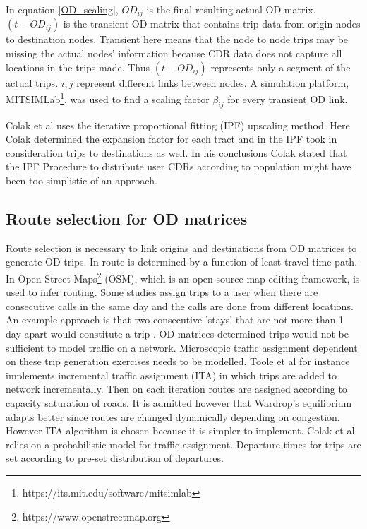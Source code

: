 \documentclass[12pt, a4paper]{report}
\theoremstyle{definition}
\theoremstyle{definition}%
\theoremstyle{definition}%
\theoremstyle{definition}%
\theoremstyle{definition}%
\theoremstyle{definition}%
\begin{document}
In equation \ref{OD_scaling}, $OD_{ij}$ is the final resulting actual OD matrix.  $(t-OD_{ij})$ is the transient OD matrix that contains trip data from origin nodes to destination nodes. Transient here means that the node to node trips may be missing the actual nodes' information because CDR data does not capture all locations in the trips made. Thus $(t-OD_{ij})$ represents only a segment of the actual trips. $i,j$ represent different links between nodes. A simulation platform, MITSIMLab\footnote{https://its.mit.edu/software/mitsimlab}, was used to find a scaling factor $\beta_{ij}$ for every transient OD link.

Colak et al uses the iterative proportional fitting (IPF) upscaling method. Here Colak determined the expansion factor for each tract and in the IPF took in consideration trips to destinations as well. In his conclusions Colak stated that the IPF Procedure to distribute user CDRs according to population might have been too simplistic of an approach.


\subsection{Route selection for OD matrices}
Route selection is necessary to link origins and destinations from OD matrices to generate OD trips. In \cite{Iqbal2014} route is determined by a function of least travel time path. In \cite{Toole2015} Open Street Maps\footnote{https://www.openstreetmap.org} (OSM), which is an open source map editing framework, is used to infer routing. Some studies assign trips to a user when there are consecutive calls in the same day and the calls are done from different locations. An example approach is that two consecutive 'stays' that are not more than 1 day apart would constitute a trip \cite{Colak2015,Toole2015}. 
OD matrices determined trips would not be sufficient to model traffic on a network. Microscopic traffic assignment dependent on these trip generation exercises needs to be modelled. Toole et al for instance implements incremental traffic assignment (ITA) in which trips are added to network incrementally. Then on each iteration routes are assigned according to capacity saturation of roads. It is admitted however that Wardrop's equilibrium  adapts better since routes are changed dynamically depending on congestion. However ITA algorithm is chosen because it is simpler to implement. Colak et al relies on a probabilistic model for traffic assignment. Departure times for trips are set according to pre-set distribution of departures.
\end{document}
